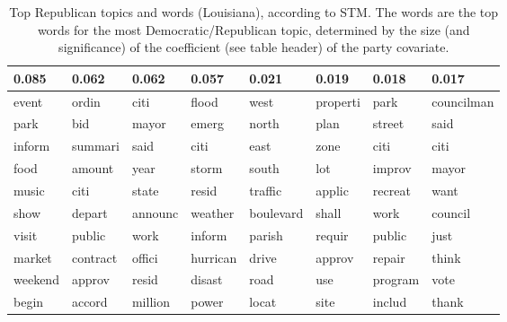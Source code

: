 \begin{table}[ht]
\centering
\begin{tabular}{llllllll}
  \hline
0.085 & 0.062 & 0.062 & 0.057 & 0.021 & 0.019 & 0.018 & 0.017 \\ 
  \hline
event & ordin & citi & flood & west & properti & park & councilman \\ 
  park & bid & mayor & emerg & north & plan & street & said \\ 
  inform & summari & said & citi & east & zone & citi & citi \\ 
  food & amount & year & storm & south & lot & improv & mayor \\ 
  music & citi & state & resid & traffic & applic & recreat & want \\ 
  show & depart & announc & weather & boulevard & shall & work & council \\ 
  visit & public & work & inform & parish & requir & public & just \\ 
  market & contract & offici & hurrican & drive & approv & repair & think \\ 
  weekend & approv & resid & disast & road & use & program & vote \\ 
  begin & accord & million & power & locat & site & includ & thank \\ 
   \hline
\end{tabular}
\caption{Top Republican topics and words (Louisiana), according to STM. 
             The words are the top words for the most Democratic/Republican topic, determined
             by the size (and significance) of the coefficient (see table header) of the party covariate.} 
\label{tabSTMLARep}
\end{table}

